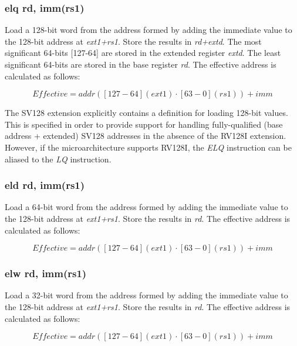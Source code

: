 \documentclass{article}
\begin{document}
\subsubsection{elq rd, imm(rs1)}
Load a 128-bit word from the address formed by adding the immediate value to the 
128-bit address at \textit{ext1+rs1}.  Store the results in \textit{rd+extd}.  The most 
significant 64-bits [127-64] are stored in the extended register \textit{extd}.  The least 
significant 64-bits are stored in the base register \textit{rd}.  The effective 
address is calculated as follows: 

\begin{equation}
Effective = addr([127-64](ext1) \cdot [63-0](rs1))+imm
\end{equation}

\begin{commentary}
The SV128 extension explicitly contains a definition for loading 128-bit values.  
This is specified in order to provide support for handling fully-qualified (base 
address + extended) SV128 addresses in the absence of the RV128I extension.  However, 
if the microarchitecture supports RV128I, the \textit{ELQ} instruction can be aliased 
to the \textit{LQ} instruction.
\end{commentary}


\subsubsection{eld rd, imm(rs1)}
Load a 64-bit word from the address formed by adding the immediate value to the 
128-bit address at \textit{ext1+rs1}.  Store the results in \textit{rd}.  The effective 
address is calculated as follows: 

\begin{equation}
Effective = addr([127-64](ext1) \cdot [63-0](rs1))+imm
\end{equation}

\subsubsection{elw rd, imm(rs1)}
Load a 32-bit word from the address formed by adding the immediate value to the 
128-bit address at \textit{ext1+rs1}.  Store the results in \textit{rd}.  The effective 
address is calculated as follows: 

\begin{equation}
Effective = addr([127-64](ext1) \cdot [63-0](rs1))+imm
\end{equation}
\end{document}
